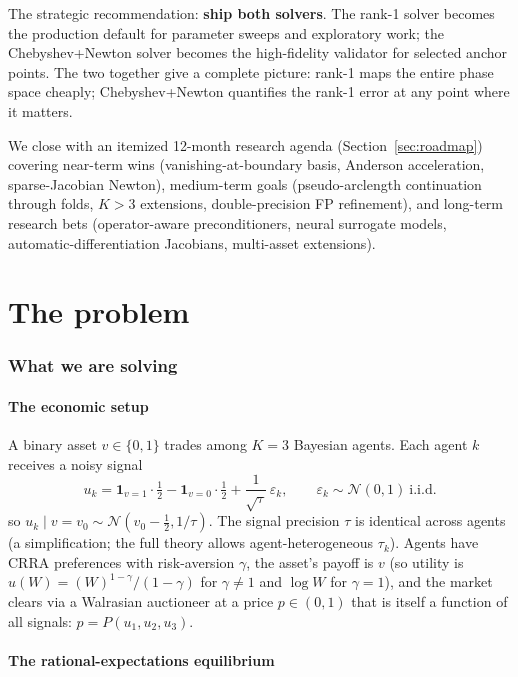 \documentclass[11pt]{article}
\begin{document}
The strategic recommendation: \textbf{ship both solvers}. The rank-1 solver becomes
the production default for parameter sweeps and exploratory work; the Chebyshev+Newton
solver becomes the high-fidelity validator for selected anchor points. The two together
give a complete picture: rank-1 maps the entire phase space cheaply; Chebyshev+Newton
quantifies the rank-1 error at any point where it matters.

We close with an itemized 12-month research agenda (Section~\ref{sec:roadmap}) covering
near-term wins (vanishing-at-boundary basis, Anderson acceleration, sparse-Jacobian Newton),
medium-term goals (pseudo-arclength continuation through folds, $K>3$ extensions,
double-precision FP refinement), and long-term research bets (operator-aware preconditioners,
neural surrogate models, automatic-differentiation Jacobians, multi-asset extensions).

\newpage

\part{The problem}

\section{What we are solving}\label{sec:problem}

\subsection{The economic setup}

A binary asset $v\in\{0,1\}$ trades among $K=3$ Bayesian agents. Each agent $k$ receives
a noisy signal
\[
u_k = \mathbf{1}_{v=1}\cdot \tfrac{1}{2} - \mathbf{1}_{v=0}\cdot \tfrac{1}{2} + \frac{1}{\sqrt{\tau}}\,\varepsilon_k,
\qquad \varepsilon_k\sim\mathcal N(0,1)\ \text{i.i.d.}
\]
so $u_k\mid v=v_0\sim\mathcal N(v_0\!-\!\tfrac{1}{2},1/\tau)$. The signal precision $\tau$
is identical across agents (a simplification; the full theory allows agent-heterogeneous
$\tau_k$). Agents have CRRA preferences with risk-aversion $\gamma$, the asset's payoff is
$v$ (so utility is $u(W) = (W)^{1-\gamma}/(1-\gamma)$ for $\gamma\neq 1$ and $\log W$ for
$\gamma=1$), and the market clears via a Walrasian auctioneer at a price $p\in(0,1)$ that
is itself a function of all signals: $p = P(u_1, u_2, u_3)$.

\subsection{The rational-expectations equilibrium}
\end{document}
